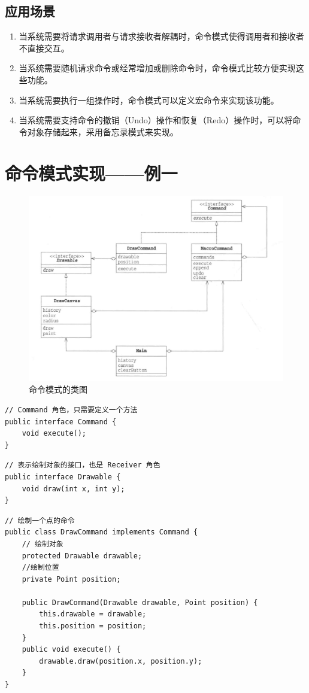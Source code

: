 \subsection{应用场景}
\begin{enumerate}
	\item 当系统需要将请求调用者与请求接收者解耦时，命令模式使得调用者和接收者不直接交互。
	\item 当系统需要随机请求命令或经常增加或删除命令时，命令模式比较方便实现这些功能。
	\item 当系统需要执行一组操作时，命令模式可以定义宏命令来实现该功能。
	\item 当系统需要支持命令的撤销（Undo）操作和恢复（Redo）操作时，可以将命令对象存储起来，采用备忘录模式来实现。
\end{enumerate}
\section{命令模式实现——例一}
\begin{figure}[!h]
	\centering
	\includegraphics[width=\textwidth]{image/22-1}
	\caption{命令模式的类图}
\end{figure}
\begin{lstlisting}
// Command 角色，只需要定义一个方法
public interface Command {
	void execute();
}
\end{lstlisting}
\begin{lstlisting}
// 表示绘制对象的接口，也是 Receiver 角色
public interface Drawable {
	void draw(int x, int y);
}
\end{lstlisting}
\begin{lstlisting}
// 绘制一个点的命令
public class DrawCommand implements Command {
	// 绘制对象
	protected Drawable drawable;
	//绘制位置
	private Point position;
	
	public DrawCommand(Drawable drawable, Point position) {
		this.drawable = drawable;
		this.position = position;
	}
	public void execute() {
		drawable.draw(position.x, position.y);
	}
}
\end{lstlisting}

